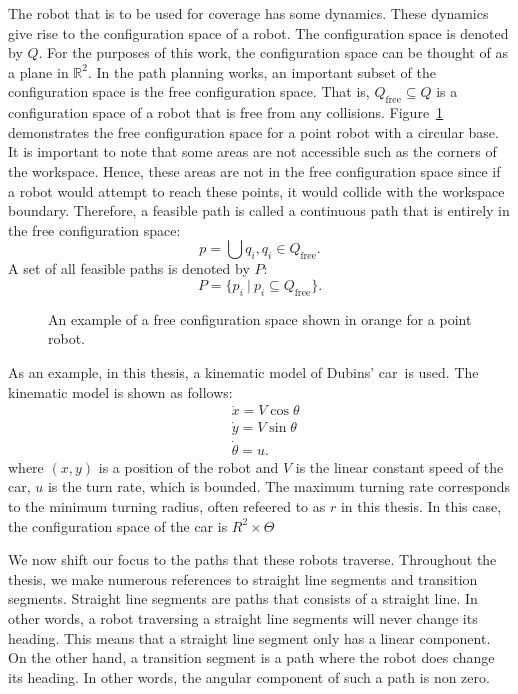\documentclass[../main.tex]{subfiles}
\begin{document}
The robot that is to be used for coverage has some dynamics. These dynamics give rise to the configuration space of a robot. The configuration space is denoted by $Q$. For the purposes of this work, the configuration space can be thought of as a plane in $\mathbb{R}^2$. In the path planning works, an important subset of the configuration space is the free configuration space. That is, $Q_{\text{free}}\subseteq Q$ is a configuration space of a robot that is free from any collisions. Figure~\ref{fig:configuration_space} demonstrates the free configuration space for a point robot with a circular base. It is important to note that some areas are not accessible such as the corners of the workspace. Hence, these areas are not in the free configuration space since if a robot would attempt to reach these points, it would collide with the workspace boundary. Therefore, a feasible path is called a continuous path that is entirely in the free configuration space:
\begin{equation}
	p=\bigcup q_i, q_i\in Q_{\text{free}}.
\end{equation}
A set of all feasible paths is denoted by $P$:
\begin{equation}
	P=\{p_i\ |\ p_i\subseteq Q_{\text{free}}\}.
\end{equation}

\begin{figure}
	\centering
	
	\caption{An example of a free configuration space shown in orange for a point robot.}
	\label{fig:configuration_space}
\end{figure}

As an example, in this thesis, a kinematic model of Dubins' car~\cite{dubins1957curves}is used. The kinematic model is shown as follows:
\begin{equation}
	\begin{aligned}
		& \dot{x}=V\cos{\theta}\\
		& \dot{y}=V\sin{\theta}\\
		& \dot{\theta}=u.
	\end{aligned}
\end{equation}
where $(x,y)$ is a position of the robot and $V$ is the linear constant speed of the car, $u$ is the turn rate, which is bounded. The maximum turning rate corresponds to the minimum  turning radius, often refeered to as $r$ in this thesis. In this case, the configuration space of the car is $R^2\times\Theta$

We now shift our focus to the paths that these robots traverse. Throughout the thesis, we make numerous references to straight line segments and transition segments. Straight line segments are paths that consists of a straight line. In other words, a robot traversing a straight line segments will never change its heading. This means that a straight line segment only has a linear component. On the other hand, a transition segment is a path where the robot does change its heading. In other words, the angular component of such a path is non zero.
\end{document}

